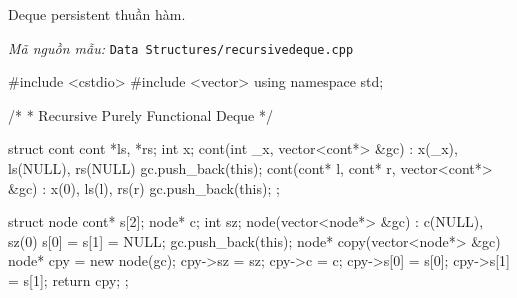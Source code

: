 \documentclass[11pt]{article}
\newcommand{\codepath}[1]{\par\noindent\textit{Mã nguồn mẫu:} \texttt{#1}\par}
\begin{document}
Deque persistent thuần hàm.

\codepath{Data Structures/recursivedeque.cpp}

\begingroup\scriptsize
\begin{vncode}
#include <cstdio>
#include <vector>
using namespace std;

/*
 * Recursive Purely Functional Deque
 */

struct cont {
	cont *ls, *rs;
	int x;
	cont(int _x, vector<cont*> &gc) :
		x(_x), ls(NULL), rs(NULL) {
		gc.push_back(this);
	}
	cont(cont* l, cont* r, vector<cont*> &gc) :
		x(0), ls(l), rs(r) {
		gc.push_back(this);
	}
};

struct node {
	cont* s[2];
	node* c;
	int sz;
	node(vector<node*> &gc) : c(NULL), sz(0) {
		s[0] = s[1] = NULL;
		gc.push_back(this);
	}
	node* copy(vector<node*> &gc) {
		node* cpy = new node(gc);
		cpy->sz = sz; cpy->c = c;
		cpy->s[0] = s[0]; cpy->s[1] = s[1];
		return cpy;
	}
};


\end{vncode}
\end{document}

